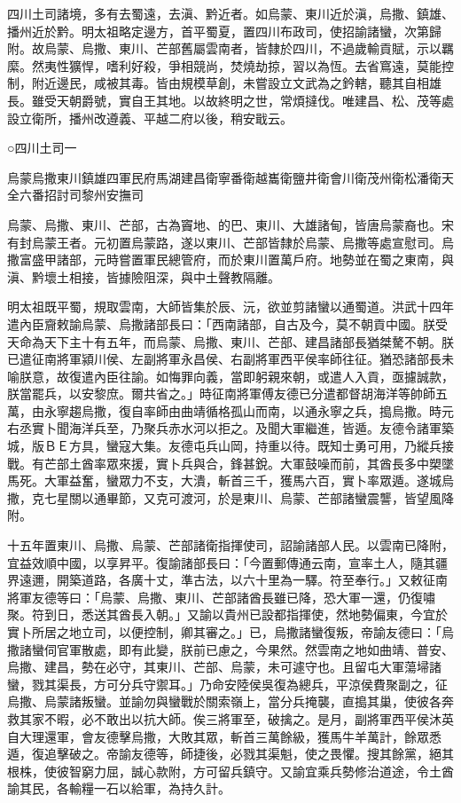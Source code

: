 
\begin{pinyinscope}
四川土司諸境，多有去蜀遠，去滇、黔近者。如烏蒙、東川近於滇，烏撒、鎮雄、播州近於黔。明太祖略定邊方，首平蜀夏，置四川布政司，使招諭諸蠻，次第歸附。故烏蒙、烏撒、東川、芒部舊屬雲南者，皆隸於四川，不過歲輸貢賦，示以羈縻。然夷性獷悍，嗜利好殺，爭相競尚，焚燒劫掠，習以為恆。去省窵遠，莫能控制，附近邊民，咸被其毒。皆由規模草創，未嘗設立文武為之鈐轄，聽其自相雄長。雖受天朝爵號，實自王其地。以故終明之世，常煩撻伐。唯建昌、松、茂等處設立衛所，播州改遵義、平越二府以後，稍安戢云。

○四川土司一

烏蒙烏撒東川鎮雄四軍民府馬湖建昌衛寧番衛越巂衛鹽井衛會川衛茂州衛松潘衛天全六番招討司黎州安撫司

烏蒙、烏撒、東川、芒部，古為竇地、的巴、東川、大雄諸甸，皆唐烏蒙裔也。宋有封烏蒙王者。元初置烏蒙路，遂以東川、芒部皆隸於烏蒙、烏撒等處宣慰司。烏撒富盛甲諸部，元時嘗置軍民總管府，而於東川置萬戶府。地勢並在蜀之東南，與滇、黔壞土相接，皆據險阻深，與中土聲教隔離。

明太祖既平蜀，規取雲南，大師皆集於辰、沅，欲並剪諸蠻以通蜀道。洪武十四年遣內臣齎敕諭烏蒙、烏撒諸部長曰：「西南諸部，自古及今，莫不朝貢中國。朕受天命為天下主十有五年，而烏蒙、烏撒、東川、芒部、建昌諸部長猶桀驁不朝。朕已遣征南將軍潁川侯、左副將軍永昌侯、右副將軍西平侯率師往征。猶恐諸部長未喻朕意，故復遣內臣往諭。如悔罪向義，當即躬親來朝，或遣人入貢，亟攄誠款，朕當罷兵，以安黎庶。爾共省之。」時征南將軍傅友德已分遣都督胡海洋等帥師五萬，由永寧趨烏撒，復自率師由曲靖循格孤山而南，以通永寧之兵，搗烏撒。時元右丞實卜聞海洋兵至，乃聚兵赤水河以拒之。及聞大軍繼進，皆遁。友德令諸軍築城，版ＢＥ方具，蠻寇大集。友德屯兵山岡，持重以待。既知士勇可用，乃縱兵接戰。有芒部土酋率眾來援，實卜兵與合，鋒甚銳。大軍鼓噪而前，其酋長多中槊墜馬死。大軍益奮，蠻眾力不支，大潰，斬首三千，獲馬六百，實卜率眾遁。遂城烏撒，克七星關以通畢節，又克可渡河，於是東川、烏蒙、芒部諸蠻震讋，皆望風降附。

十五年置東川、烏撒、烏蒙、芒部諸衛指揮使司，詔諭諸部人民。以雲南已降附，宜益效順中國，以享昇平。復諭諸部長曰：「今置郵傳通云南，宣率土人，隨其疆界遠邇，開築道路，各廣十丈，準古法，以六十里為一驛。符至奉行。」又敕征南將軍友德等曰：「烏蒙、烏撒、東川、芒部諸酋長雖已降，恐大軍一還，仍復嘯聚。符到日，悉送其酋長入朝。」又諭以貴州已設都指揮使，然地勢偏東，今宜於實卜所居之地立司，以便控制，卿其審之。」已，烏撒諸蠻復叛，帝諭友德曰：「烏撒諸蠻伺官軍散處，即有此變，朕前已慮之，今果然。然雲南之地如曲靖、普安、烏撒、建昌，勢在必守，其東川、芒部、烏蒙，未可遽守也。且留屯大軍蕩埽諸蠻，戮其渠長，方可分兵守禦耳。」乃命安陸侯吳復為總兵，平涼侯費聚副之，征烏撒、烏蒙諸叛蠻。並諭勿與蠻戰於關索嶺上，當分兵掩襲，直搗其巢，使彼各奔救其家不暇，必不敢出以抗大師。俟三將軍至，破擒之。是月，副將軍西平侯沐英自大理還軍，會友德擊烏撒，大敗其眾，斬首三萬餘級，獲馬牛羊萬計，餘眾悉遁，復追擊破之。帝諭友德等，師捷後，必戮其渠魁，使之畏懼。搜其餘黨，絕其根株，使彼智窮力屈，誠心款附，方可留兵鎮守。又諭宜乘兵勢修治道途，令土酋諭其民，各輸糧一石以給軍，為持久計。


\end{pinyinscope}
